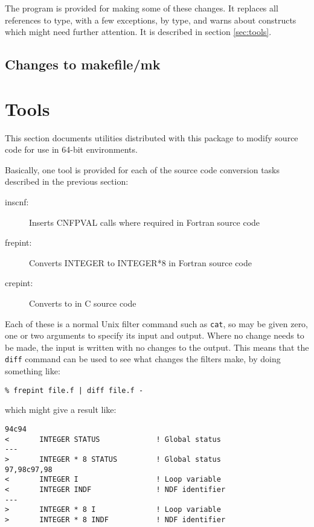 \documentclass[twoside,11pt]{article}
\renewcommand{\_}{\texttt{\symbol{95}}}
\begin{document}
The program  is provided for making some of these
changes.  It replaces all references to  type, with a few exceptions,
by \cc{INT\_BIG} type, and warns about constructs which might need further
attention.
It is described in section \ref{sec:tools}.


\subsection{Changes to makefile/mk}





\section{Tools\label{sec:tools}}

This section documents utilities distributed with this package
to modify source code for use in 64-bit environments.

Basically, one tool is provided for each of the source code conversion
tasks described in the previous section:
\begin{description}
\item[inscnf:] Inserts CNF\_PVAL calls where required in Fortran source code
\item[frepint:] Converts INTEGER to INTEGER*8 in Fortran source code
\item[crepint:] Converts  to \cc{INT\_BIG} in C source code
\end{description}
Each of these is a normal Unix filter command such as {\tt cat}, 
so may be given zero, one or two arguments to specify its input and output.
Where no change needs to be made, the input is written with no changes 
to the output.  This means that the {\tt diff} command can be used 
to see what changes the filters make, by doing something like:
\begin{squote}
\begin{verbatim}
% frepint file.f | diff file.f -
\end{verbatim}
\end{squote}
which might give a result like:
\begin{squote}
\begin{verbatim}
94c94
<       INTEGER STATUS             ! Global status
---
>       INTEGER * 8 STATUS         ! Global status
97,98c97,98
<       INTEGER I                  ! Loop variable
<       INTEGER INDF               ! NDF identifier
---
>       INTEGER * 8 I              ! Loop variable
>       INTEGER * 8 INDF           ! NDF identifier
\end{verbatim}
\end{squote}
\end{document}
